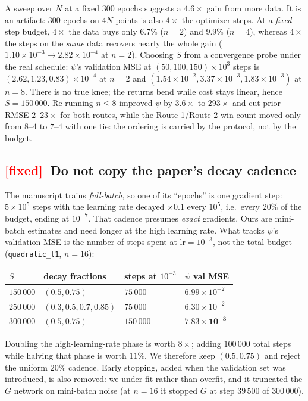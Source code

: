 \documentclass[11pt]{article}
\newcommand{\file}[1]{\texttt{#1}}
\newcommand{\MUST}{\textcolor{red}{\textbf{[fixed]}}}
\begin{document}
A sweep over $N$ at a fixed $300$ epochs suggests a $4.6\times$ gain from more
data. It is an artifact: $300$ epochs on $4N$ points is also $4\times$ the
optimizer steps. At a \emph{fixed} step budget, $4\times$ the data buys only
$6.7\%$ ($n=2$) and $9.9\%$ ($n=4$), whereas $4\times$ the steps on the
\emph{same} data recovers nearly the whole gain
($1.10\times10^{-3}\to2.82\times10^{-4}$ at $n=2$). Choosing $S$ from a
convergence probe under the real schedule: $\psi$'s validation MSE at
$(50,100,150)\times10^{3}$ steps is $(2.62,1.23,0.83)\times10^{-4}$ at $n=2$ and
$(1.54\times10^{-2},3.37\times10^{-3},1.83\times10^{-3})$ at $n=8$. There is no
true knee; the returns bend while cost stays linear, hence $S=150\,000$.
Re-running $n\leqslant8$ improved $\psi$ by $3.6\times$ to $293\times$ and cut
prior RMSE $2$--$23\times$ for both routes, while the Route-1/Route-2 win count
moved only from $8$--$4$ to $7$--$4$ with one tie: the ordering is carried by the
protocol, not by the budget.

\subsection{\MUST\ Do not copy the paper's decay cadence}
\label{sec:decay}

The manuscript trains \emph{full-batch}, so one of its ``epochs'' is one gradient
step: $5\times10^{5}$ steps with the learning rate decayed $\times0.1$ every
$10^{5}$, i.e.\ every $20\%$ of the budget, ending at $10^{-7}$. That cadence
presumes \emph{exact} gradients. Ours are mini-batch estimates and need longer at
the high learning rate. What tracks $\psi$'s validation MSE is the number of
steps spent at $\text{lr}=10^{-3}$, not the total budget
(\file{quadratic\_l1}, $n=16$):

\begin{center}
\begin{tabular}{@{}llll@{}}
\toprule
$S$ & decay fractions & steps at $10^{-3}$ & $\psi$ val MSE \\
\midrule
$150\,000$ & $(0.5,0.75)$ & $75\,000$ & $6.99\times10^{-2}$ \\
$250\,000$ & $(0.3,0.5,0.7,0.85)$ & $75\,000$ & $6.30\times10^{-2}$ \\
$300\,000$ & $(0.5,0.75)$ & $150\,000$ & $\mathbf{7.83\times10^{-3}}$ \\
\bottomrule
\end{tabular}
\end{center}

Doubling the high-learning-rate phase is worth $8\times$; adding $100\,000$ total
steps while halving that phase is worth $11\%$. We therefore keep
$(0.5, 0.75)$ and reject the uniform $20\%$ cadence. Early stopping, added when
the validation set was introduced, is also removed: we under-fit rather than
overfit, and it truncated the $G$ network on mini-batch noise (at $n=16$ it
stopped $G$ at step $39\,500$ of $300\,000$).
\end{document}

